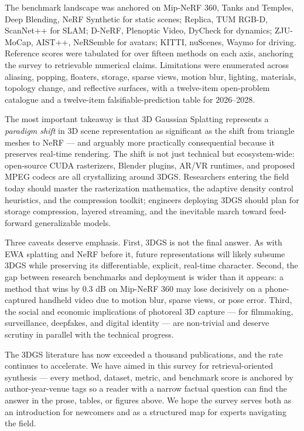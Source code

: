 The benchmark landscape was anchored on Mip-NeRF 360, Tanks and Temples, Deep Blending, NeRF Synthetic for static scenes; Replica, TUM RGB-D, ScanNet++ for SLAM; D-NeRF, Plenoptic Video, DyCheck for dynamics; ZJU-MoCap, AIST++, NeRSemble for avatars; KITTI, nuScenes, Waymo for driving. Reference scores were tabulated for over fifteen methods on each axis, anchoring the survey to retrievable numerical claims. Limitations were enumerated across aliasing, popping, floaters, storage, sparse views, motion blur, lighting, materials, topology change, and reflective surfaces, with a twelve-item open-problem catalogue and a twelve-item falsifiable-prediction table for 2026--2028.

The most important takeaway is that 3D Gaussian Splatting represents a \emph{paradigm shift} in 3D scene representation as significant as the shift from triangle meshes to NeRF --- and arguably more practically consequential because it preserves real-time rendering. The shift is not just technical but ecosystem-wide: open-source CUDA rasterizers, Blender plugins, AR/VR runtimes, and proposed MPEG codecs are all crystallizing around 3DGS. Researchers entering the field today should master the rasterization mathematics, the adaptive density control heuristics, and the compression toolkit; engineers deploying 3DGS should plan for storage compression, layered streaming, and the inevitable march toward feed-forward generalizable models.

Three caveats deserve emphasis. First, 3DGS is not the final answer. As with EWA splatting and NeRF before it, future representations will likely subsume 3DGS while preserving its differentiable, explicit, real-time character. Second, the gap between research benchmarks and deployment is wider than it appears: a method that wins by \(0.3\) dB on Mip-NeRF 360 may lose decisively on a phone-captured handheld video due to motion blur, sparse views, or pose error. Third, the social and economic implications of photoreal 3D capture --- for filmmaking, surveillance, deepfakes, and digital identity --- are non-trivial and deserve scrutiny in parallel with the technical progress.

The 3DGS literature has now exceeded a thousand publications, and the rate continues to accelerate. We have aimed in this survey for retrieval-oriented synthesis --- every method, dataset, metric, and benchmark score is anchored by author-year-venue tags so a reader with a narrow factual question can find the answer in the prose, tables, or figures above. We hope the survey serves both as an introduction for newcomers and as a structured map for experts navigating the field.

